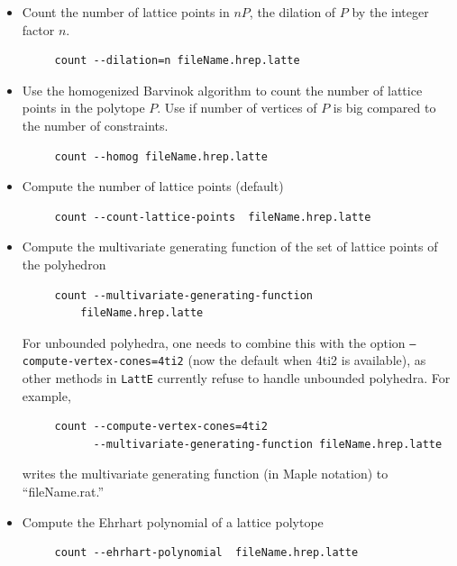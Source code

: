 \documentclass{article}
\newcommand{\latte}{{\tt LattE}\xspace}
\begin{document}
\begin{itemize}
\item Count the number of lattice points in $nP$, the dilation of $P$ by the integer factor $n$.
        \begin{verbatim}
     count --dilation=n fileName.hrep.latte
        \end{verbatim} 

\item Use the homogenized Barvinok algorithm \cite{latte3} to count  the number of lattice points in the polytope $P$. Use if number of vertices of $P$ is big compared to the number of constraints. 
        \begin{verbatim}
     count --homog fileName.hrep.latte
        \end{verbatim} 
\item Compute the number of lattice points (default)
        \begin{verbatim}
     count --count-lattice-points  fileName.hrep.latte
        \end{verbatim} 
\item Compute the multivariate generating function of the set of lattice points of the polyhedron
        \begin{verbatim}
     count --multivariate-generating-function  
         fileName.hrep.latte
        \end{verbatim} 
For unbounded polyhedra, one needs to combine
  this with the option {\tt --compute-vertex-cones=4ti2} (now the default when
  4ti2 is available), as other methods in \latte currently refuse to handle
  unbounded polyhedra. For example,  
        \begin{verbatim}
     count --compute-vertex-cones=4ti2 
           --multivariate-generating-function fileName.hrep.latte
        \end{verbatim}
  writes the multivariate generating function (in Maple notation) to ``fileName.rat.''
\item Compute the Ehrhart polynomial of a lattice polytope
        \begin{verbatim}
     count --ehrhart-polynomial  fileName.hrep.latte
        \end{verbatim} 

\end{itemize}
\end{document}
